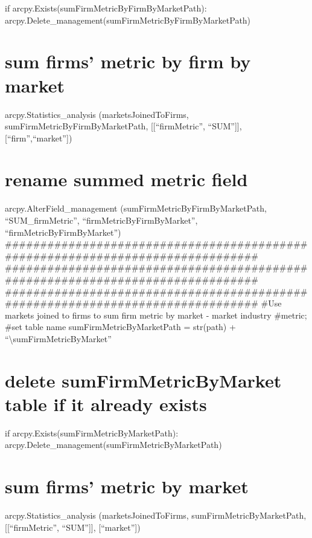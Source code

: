 \documentclass[]{article}
\begin{document}
if arcpy.Exists(sumFirmMetricByFirmByMarketPath):
arcpy.Delete\_management(sumFirmMetricByFirmByMarketPath)

\section{sum firms' metric by firm by
market}\label{sum-firms-metric-by-firm-by-market}

arcpy.Statistics\_analysis (marketsJoinedToFirms,
sumFirmMetricByFirmByMarketPath, {[}{[}``firmMetric'', ``SUM''{]}{]},
{[}``firm'',``market''{]})

\section{rename summed metric field}\label{rename-summed-metric-field}

arcpy.AlterField\_management (sumFirmMetricByFirmByMarketPath,
``SUM\_firmMetric'', ``firmMetricByFirmByMarket'',
``firmMetricByFirmByMarket'')
\#\#\#\#\#\#\#\#\#\#\#\#\#\#\#\#\#\#\#\#\#\#\#\#\#\#\#\#\#\#\#\#\#\#\#\#\#\#\#\#\#\#\#\#\#\#\#\#\#\#\#\#\#\#\#\#\#\#\#\#\#\#\#\#\#\#\#\#\#\#\#\#\#\#\#\#\#\#\#
\#\#\#\#\#\#\#\#\#\#\#\#\#\#\#\#\#\#\#\#\#\#\#\#\#\#\#\#\#\#\#\#\#\#\#\#\#\#\#\#\#\#\#\#\#\#\#\#\#\#\#\#\#\#\#\#\#\#\#\#\#\#\#\#\#\#\#\#\#\#\#\#\#\#\#\#\#\#\#
\#\#\#\#\#\#\#\#\#\#\#\#\#\#\#\#\#\#\#\#\#\#\#\#\#\#\#\#\#\#\#\#\#\#\#\#\#\#\#\#\#\#\#\#\#\#\#\#\#\#\#\#\#\#\#\#\#\#\#\#\#\#\#\#\#\#\#\#\#\#\#\#\#\#\#\#\#\#\#
\#Use markets joined to firms to sum firm metric by market - market
industry \#metric; \#set table name sumFirmMetricByMarketPath =
str(path) + ``\textbackslash{}sumFirmMetricByMarket''

\section{delete sumFirmMetricByMarket table if it already
exists}\label{delete-sumfirmmetricbymarket-table-if-it-already-exists}

if arcpy.Exists(sumFirmMetricByMarketPath):
arcpy.Delete\_management(sumFirmMetricByMarketPath)

\section{sum firms' metric by market}\label{sum-firms-metric-by-market}

arcpy.Statistics\_analysis (marketsJoinedToFirms,
sumFirmMetricByMarketPath, {[}{[}``firmMetric'', ``SUM''{]}{]},
{[}``market''{]})
\end{document}
